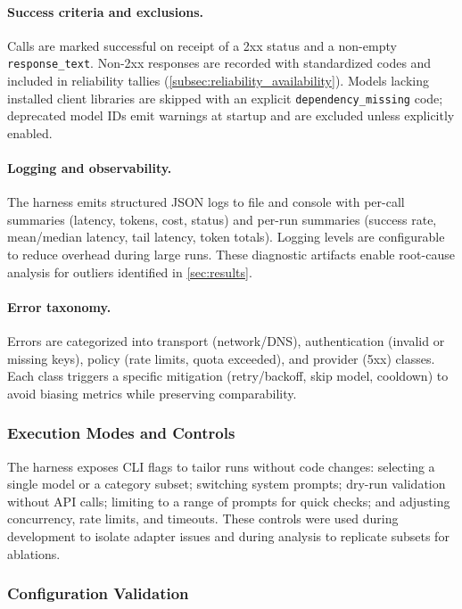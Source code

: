 \paragraph{Success criteria and exclusions.} Calls are marked successful on receipt of a 2xx status and a non-empty \verb|response_text|. Non-2xx responses are recorded with standardized codes and included in reliability tallies (\cref{subsec:reliability_availability}). Models lacking installed client libraries are skipped with an explicit \verb|dependency_missing| code; deprecated model IDs emit warnings at startup and are excluded unless explicitly enabled.

\paragraph{Logging and observability.} The harness emits structured JSON logs to file and console with per-call summaries (latency, tokens, cost, status) and per-run summaries (success rate, mean/median latency, tail latency, token totals). Logging levels are configurable to reduce overhead during large runs. These diagnostic artifacts enable root-cause analysis for outliers identified in \cref{sec:results}.

\paragraph{Error taxonomy.} Errors are categorized into transport (network/DNS), authentication (invalid or missing keys), policy (rate limits, quota exceeded), and provider (5xx) classes. Each class triggers a specific mitigation (retry/backoff, skip model, cooldown) to avoid biasing metrics while preserving comparability.

\subsubsection{Execution Modes and Controls}
\label{subsubsec:execution_modes}

The harness exposes CLI flags to tailor runs without code changes: selecting a single model or a category subset; switching system prompts; dry-run validation without API calls; limiting to a range of prompts for quick checks; and adjusting concurrency, rate limits, and timeouts. These controls were used during development to isolate adapter issues and during analysis to replicate subsets for ablations.

\subsubsection{Configuration Validation}
\label{subsubsec:config_validation}

